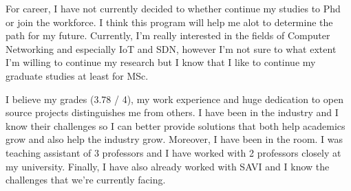 \documentclass[11pt,a4paper,sans]{moderncv}        %
\begin{document}
For career, I have not currently decided to whether continue my studies to
Phd or join the workforce. I think this program will help me alot to determine
the path for my future. Currently, I'm really interested in the fields of
Computer Networking and especially IoT and SDN, however I'm not sure to what
extent I'm willing to continue my research but I know that I like to continue my
graduate studies at least for MSc.

I believe my grades (3.78 / 4), my work experience and huge dedication
to open source projects distinguishes me from others. I have been in the
industry and I know their challenges so I can better provide solutions that
both help academics grow and also help the industry grow. Moreover, I have been
in the room. I was teaching assistant of 3 professors and I have worked with
2 professors closely at my university. Finally, I have also already worked
with SAVI and I know the challenges that we're currently facing.

\makeletterclosing
\end{document}
